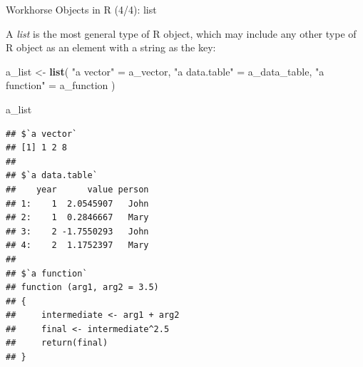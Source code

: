 \documentclass[10pt,ignorenonframetext,]{beamer}
\newenvironment{Shaded}{\begin{snugshade}}{\end{snugshade}}
\newcommand{\KeywordTok}[1]{\textcolor[rgb]{0.13,0.29,0.53}{\textbf{{#1}}}}
\newcommand{\StringTok}[1]{\textcolor[rgb]{0.31,0.60,0.02}{{#1}}}
\newcommand{\NormalTok}[1]{{#1}}
\begin{document}
\begin{frame}[fragile]{Workhorse Objects in R (4/4): list}

A \emph{list} is the most general type of R object, which may include
any other type of R object as an element with a string as the key:

\tiny

\begin{Shaded}
\begin{Highlighting}[]
\NormalTok{a_list <-}\StringTok{ }\KeywordTok{list}\NormalTok{(}
  \StringTok{"a vector"} \NormalTok{=}\StringTok{ }\NormalTok{a_vector,}
  \StringTok{"a data.table"} \NormalTok{=}\StringTok{ }\NormalTok{a_data_table,}
  \StringTok{"a function"} \NormalTok{=}\StringTok{ }\NormalTok{a_function}
\NormalTok{)}

\NormalTok{a_list}
\end{Highlighting}
\end{Shaded}

\begin{verbatim}
## $`a vector`
## [1] 1 2 8
## 
## $`a data.table`
##    year      value person
## 1:    1  2.0545907   John
## 2:    1  0.2846667   Mary
## 3:    2 -1.7550293   John
## 4:    2  1.1752397   Mary
## 
## $`a function`
## function (arg1, arg2 = 3.5) 
## {
##     intermediate <- arg1 + arg2
##     final <- intermediate^2.5
##     return(final)
## }
\end{verbatim}

\normalsize

\end{frame}
\end{document}
